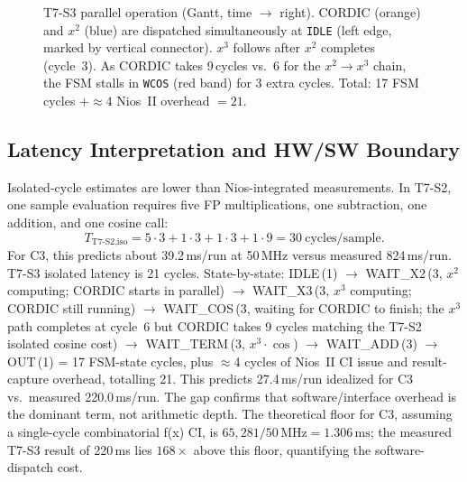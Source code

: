 \documentclass[a4paper,10pt,twocolumn]{article}
\begin{document}
\begin{figure}[t]
\caption{T7-S3 parallel operation (Gantt, time $\to$ right). CORDIC (orange) and $x^2$ (blue) are dispatched simultaneously at \texttt{IDLE} (left edge, marked by vertical connector). $x^3$ follows after $x^2$ completes (cycle~3). As CORDIC takes 9\,cycles vs.\ 6 for the $x^2{\to}x^3$ chain, the FSM stalls in \texttt{WCOS} (red band) for 3 extra cycles. Total: 17 FSM cycles $+{\approx}4$ Nios~II overhead $=21$.}
\label{fig:t7s3_fsm}
\end{figure}

\subsection{Latency Interpretation and HW/SW Boundary}
Isolated-cycle estimates are lower than Nios-integrated measurements. In T7-S2, one sample evaluation requires five FP multiplications, one subtraction, one addition, and one cosine call:
\[
T_{\text{T7-S2,iso}} = 5\cdot 3 + 1\cdot 3 + 1\cdot 3 + 1\cdot 9 = 30\ \text{cycles/sample}.
\]
For C3, this predicts about 39.2\,ms/run at 50\,MHz versus measured 824\,ms/run. T7-S3 isolated latency is 21 cycles. State-by-state: IDLE\,(1) $\to$ WAIT\_X2\,(3, $x^2$ computing; CORDIC starts in parallel) $\to$ WAIT\_X3\,(3, $x^3$ computing; CORDIC still running) $\to$ WAIT\_COS\,(3, waiting for CORDIC to finish; the $x^3$ path completes at cycle~6 but CORDIC takes 9 cycles matching the T7-S2 isolated cosine cost) $\to$ WAIT\_TERM\,(3, $x^3{\cdot}\cos$) $\to$ WAIT\_ADD\,(3) $\to$ OUT\,(1) = 17 FSM-state cycles, plus $\approx$4 cycles of Nios~II CI issue and result-capture overhead, totalling 21. This predicts 27.4\,ms/run idealized for C3 vs.\ measured 220.0\,ms/run. The gap confirms that software/interface overhead is the dominant term, not arithmetic depth. The theoretical floor for C3, assuming a single-cycle combinatorial f(x) CI, is $65{,}281/50\,\text{MHz} = 1.306\,\text{ms}$; the measured T7-S3 result of 220\,ms lies $168\times$ above this floor, quantifying the software-dispatch cost.
\end{document}
